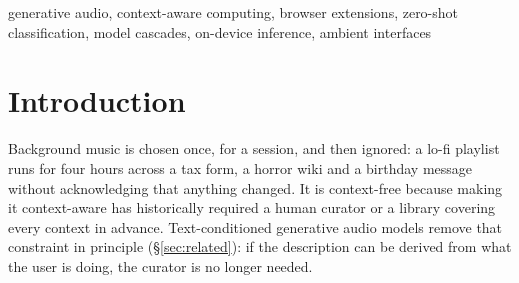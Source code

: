 \documentclass[conference]{IEEEtran}
\begin{document}
\begin{abstract}
Generative audio models can produce plausible music from text, but
placing one inside an always-on browser extension raises problems audio
quality alone does not solve: deriving a prompt from a page, keeping
browsing history private, and hiding a slow generator from the critical
path. We present Web2Music and measure where these assumptions fail. A
four-signal page descriptor adds well under a tenth of a second per
page. A three-stage cascade (keyword, zero-shot NLI, LLM) barely moves accuracy across its confidence thresholds and, with a hosted middle
stage, never meaningfully reduces off-device disclosure. Fallback-then-swap
decouples audible start from generation, though some cold requests still
run long enough to time out. Across a corpus of real sites, requests and
generated clips we report five further negative results: a crossfade
that worsens a large share of seams; substantial loss of the requested
clip duration; a sensitive-content detector that misses most of an
adversarial slice; weak mood agreement among annotators; and an
engineered prompt that loses to a bare mood word on nearly every loop
metric.
\end{abstract}

\begin{IEEEkeywords}
generative audio, context-aware computing, browser extensions, zero-shot
classification, model cascades, on-device inference, ambient interfaces
\end{IEEEkeywords}

\section{Introduction}

Background music is chosen once, for a session, and then ignored: a lo-fi
playlist runs for four hours across a tax form, a horror wiki and a birthday
message without acknowledging that anything changed. It is context-free
because making it context-aware has historically required a human curator or
a library covering every context in advance. Text-conditioned generative
audio models remove that constraint in principle (\S\ref{sec:related}): if
the description can be derived from what the user is doing, the curator is
no longer needed.
\end{document}
